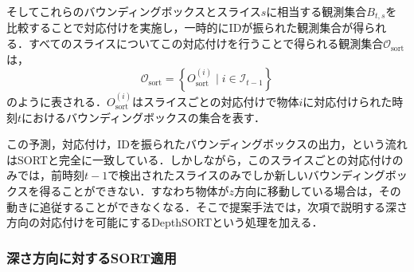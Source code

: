         そしてこれらのバウンディングボックスとスライス$s$に相当する観測集合$B_{t,s}$を比較することで対応付けを実施し，一時的にIDが振られた観測集合が得られる．すべてのスライスについてこの対応付けを行うことで得られる観測集合$\mathcal{O}_{\text{sort}}$は，
        \begin{equation}
            \label{eq:sort_identified_bboxes}
            \mathcal{O}_{\text{sort}} = \left\{O_{\text{sort}}^{(i)} \mid i \in \mathcal{I}_{t-1}\right\}
        \end{equation}
        のように表される．$O_{\text{sort}}^{(i)}$はスライスごとの対応付けで物体$i$に対応付けられた時刻$t$におけるバウンディングボックスの集合を表す．
        
        この予測，対応付け，IDを振られたバウンディングボックスの出力，という流れはSORTと完全に一致している．しかしながら，このスライスごとの対応付けのみでは，前時刻$t-1$で検出されたスライスのみでしか新しいバウンディングボックスを得ることができない．すなわち物体が$z$方向に移動している場合は，その動きに追従することができなくなる．そこで提案手法では，次項で説明する深さ方向の対応付けを可能にするDepthSORTという処理を加える．

        \subsubsection{深さ方向に対するSORT適用}

